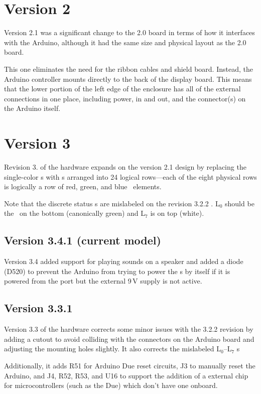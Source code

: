 \section{Version 2}
Version 2.1 was a significant change to the 2.0 board in terms of how it interfaces with the Arduino, although it had the same size and physical
layout as the 2.0 board.

This one eliminates the need for the ribbon cables and shield board. Instead, the Arduino controller mounts
directly to the back of the display board. This means that the lower portion of the left edge of the enclosure
has all of the external connections in one place, including power,  in and out, and the 
 connector(s) on the Arduino itself.

\section{Version 3}
Revision 3. of the hardware expands on the version 2.1 design by replacing the single-color \led s with
 \led s arranged into 24 logical rows---each of the eight physical rows is logically a row of red,
green, and blue \led\ elements.

Note that the discrete status \led s are mislabeled on the revision 3.2.2 . L$_0$ should be the \led\
on the bottom (canonically green) and L$_7$ is on top (white).

\subsection{Version 3.4.1 (current model)}
Version 3.4 added support for playing sounds on a speaker and added a diode (D520) to prevent
the Arduino from trying to power the \led s by itself if it is powered from the \acronym{USB}
port but the external 9\,V supply is not active.

\subsection{Version 3.3.1}
Version 3.3 of the hardware corrects some minor issues with the 3.2.2 revision by adding a cutout to avoid colliding with the
connectors on the Arduino board and adjusting the mounting holes slightly. It also corrects the mislabeled L$_0$--L$_7$ \led s

Additionally, it adds R51 for Arduino Due reset circuits, J3 to manually reset the Arduino, and J4, R52, R53, and U16 to support the addition of a external
\acronym{EEPROM} chip for microcontrollers (such as the Due) which don't have one onboard.

